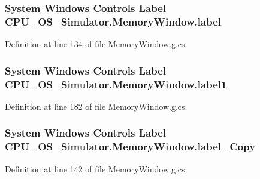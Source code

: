 \subsubsection[{label}]{\setlength{\rightskip}{0pt plus 5cm}System Windows Controls Label C\+P\+U\+\_\+\+O\+S\+\_\+\+Simulator.\+Memory\+Window.\+label\hspace{0.3cm}{\ttfamily [package]}}\label{class_c_p_u___o_s___simulator_1_1_memory_window_ad5fa08b25fc582e9b2f7c305ed12a960}


Definition at line 134 of file Memory\+Window.\+g.\+cs.

\hypertarget{class_c_p_u___o_s___simulator_1_1_memory_window_ae35c7d3110d7cf96493d6fa68274e858}{}
\subsubsection[{label1}]{\setlength{\rightskip}{0pt plus 5cm}System Windows Controls Label C\+P\+U\+\_\+\+O\+S\+\_\+\+Simulator.\+Memory\+Window.\+label1\hspace{0.3cm}{\ttfamily [package]}}\label{class_c_p_u___o_s___simulator_1_1_memory_window_ae35c7d3110d7cf96493d6fa68274e858}


Definition at line 182 of file Memory\+Window.\+g.\+cs.

\hypertarget{class_c_p_u___o_s___simulator_1_1_memory_window_a663f25aef0cd9c3755f100b3507b5f84}{}
\subsubsection[{label\+\_\+\+Copy}]{\setlength{\rightskip}{0pt plus 5cm}System Windows Controls Label C\+P\+U\+\_\+\+O\+S\+\_\+\+Simulator.\+Memory\+Window.\+label\+\_\+\+Copy\hspace{0.3cm}{\ttfamily [package]}}\label{class_c_p_u___o_s___simulator_1_1_memory_window_a663f25aef0cd9c3755f100b3507b5f84}


Definition at line 142 of file Memory\+Window.\+g.\+cs.

